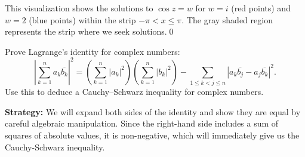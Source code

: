 This visualization shows the solutions to $\cos z = w$ for $w = i$ (red points) and $w = 2$ (blue points) within the strip $-\pi < x \leq \pi$. The gray shaded region represents the strip where we seek solutions.\qed


\begin{problembox}
\begin{problemstatement}
Prove Lagrange's identity for complex numbers:
\[
\left| \sum_{k=1}^n a_k \overline{b_k} \right|^2 = \left( \sum_{k=1}^n |a_k|^2 \right) \left( \sum_{k=1}^n |b_k|^2 \right) - \sum_{1 \leq k < j \leq n} |a_k \overline{b_j} - a_j \overline{b_k}|^2.
\]
Use this to deduce a Cauchy–Schwarz inequality for complex numbers.
\end{problemstatement}
\end{problembox}

\noindent\textbf{Strategy:} We will expand both sides of the identity and show they are equal by careful algebraic manipulation. Since the right-hand side includes a sum of squares of absolute values, it is non-negative, which will immediately give us the Cauchy-Schwarz inequality.

